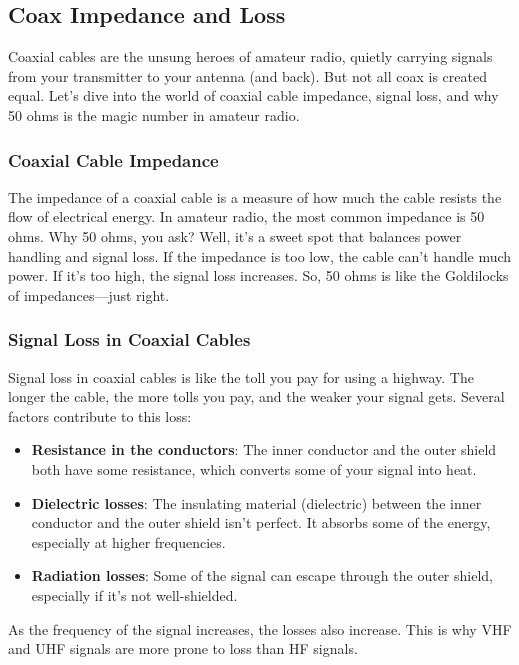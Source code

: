 \subsection{Coax Impedance and Loss}
\label{subsec:coax-imp}

Coaxial cables are the unsung heroes of amateur radio, quietly carrying signals from your transmitter to your antenna (and back). But not all coax is created equal. Let's dive into the world of coaxial cable impedance, signal loss, and why 50 ohms is the magic number in amateur radio.

\subsubsection*{Coaxial Cable Impedance}
The impedance of a coaxial cable is a measure of how much the cable resists the flow of electrical energy. In amateur radio, the most common impedance is 50 ohms. Why 50 ohms, you ask? Well, it's a sweet spot that balances power handling and signal loss. If the impedance is too low, the cable can't handle much power. If it's too high, the signal loss increases. So, 50 ohms is like the Goldilocks of impedances—just right.

\subsubsection*{Signal Loss in Coaxial Cables}
Signal loss in coaxial cables is like the toll you pay for using a highway. The longer the cable, the more tolls you pay, and the weaker your signal gets. Several factors contribute to this loss:
\begin{itemize}
    \item \textbf{Resistance in the conductors}: The inner conductor and the outer shield both have some resistance, which converts some of your signal into heat.
    \item \textbf{Dielectric losses}: The insulating material (dielectric) between the inner conductor and the outer shield isn't perfect. It absorbs some of the energy, especially at higher frequencies.
    \item \textbf{Radiation losses}: Some of the signal can escape through the outer shield, especially if it's not well-shielded.
\end{itemize}

As the frequency of the signal increases, the losses also increase. This is why VHF and UHF signals are more prone to loss than HF signals.


